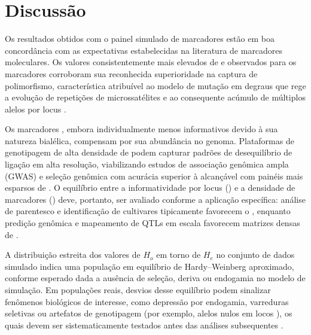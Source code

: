 
\section{Discussão}
\label{sec:discussion}

Os resultados obtidos com o painel simulado de marcadores estão em boa
concordância com as expectativas estabelecidas na literatura de marcadores
moleculares. Os valores consistentemente mais elevados de \pic{} e \he{}
observados para os marcadores \ssr{} corroboram sua reconhecida superioridade
na captura de polimorfismo, característica atribuível ao modelo de mutação
em degraus que rege a evolução de repetições de microssatélites e ao
consequente acúmulo de múltiplos alelos por locus \autocite{Ellegren2004}.

Os marcadores \snp{}, embora individualmente menos informativos devido à sua
natureza bialélica, compensam por sua abundância no genoma. Plataformas de
genotipagem de alta densidade de \snp{} podem capturar padrões de
desequilíbrio de ligação em alta resolução, viabilizando estudos de
associação genômica ampla (GWAS) e seleção genômica com acurácia superior
à alcançável com painéis mais esparsos de \ssr{} \autocite{Goddard2007}. O
equilíbrio entre a informatividade por locus (\ssr{}) e a densidade de
marcadores (\snp{}) deve, portanto, ser avaliado conforme a aplicação
específica: análise de parentesco e identificação de cultivares tipicamente
favorecem o \ssr{}, enquanto predição genômica e mapeamento de QTLs em
escala favorecem matrizes densas de \snp{}.

A distribuição estreita dos valores de $H_o$ em torno de $H_e$ no conjunto
de dados simulado indica uma população em equilíbrio de Hardy--Weinberg
aproximado, conforme esperado dada a ausência de seleção, deriva ou
endogamia no modelo de simulação. Em populações reais, desvios desse
equilíbrio podem sinalizar fenômenos biológicos de interesse, como depressão
por endogamia, varreduras seletivas ou artefatos de genotipagem (por exemplo,
alelos nulos em locos \ssr{}), os quais devem ser sistematicamente testados
antes das análises subsequentes \autocite{Peakall2006}.

